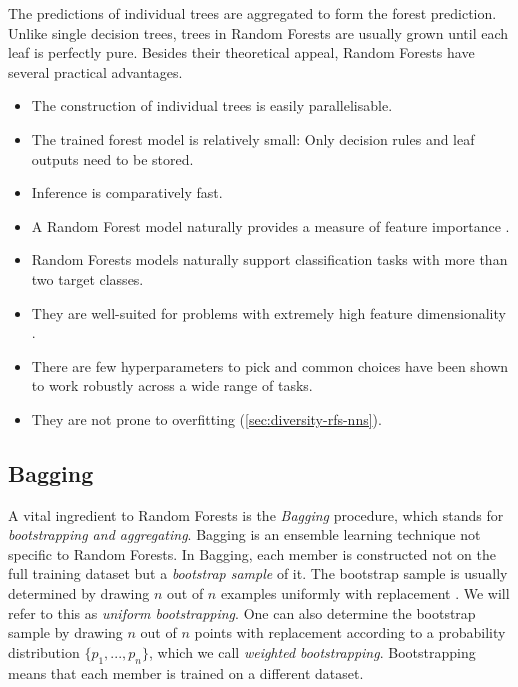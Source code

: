 \documentclass[../main.tex]{subfiles}
\begin{document}
The predictions of individual trees are aggregated to form the forest prediction. Unlike single decision trees, trees in Random Forests are usually grown until each leaf is perfectly pure. Besides their theoretical appeal, Random Forests have several practical advantages.
\begin{itemize}
    \item The construction of individual trees is easily parallelisable.
    \item The trained forest model is relatively small: Only decision rules and leaf outputs need to be stored.
    \item Inference is comparatively fast.
    \item A Random Forest model naturally provides a measure of feature importance \cite{breiman_ClassificationRegressionTrees_2017}.
    \item Random Forests models naturally support classification tasks with more than two target classes.
    \item They are well-suited for problems with extremely high feature dimensionality \cite{yang_ReviewEnsembleMethods_2010}.
    \item There are few hyperparameters to pick and common choices have been shown to work robustly across a wide range of tasks. %
    \item They are not prone to overfitting (\cf \cref{sec:diversity-rfs-nns}).
\end{itemize}


\subsection{Bagging}
\label{sec:bagging}

A vital ingredient to Random Forests is the \textit{Bagging} procedure, which stands for \textit{bootstrapping and aggregating}. Bagging is an ensemble learning technique not specific to Random Forests. In Bagging, each member is constructed not on the full training dataset but a \textit{bootstrap sample} of it. The bootstrap sample is usually determined by drawing $n$ out of $n$ examples uniformly with replacement \cite{breiman_RandomForests_2001,buschjager_GeneralizedNegativeCorrelation_2020}. We will refer to this as \textit{uniform bootstrapping}. One can also determine the bootstrap sample by drawing $n$ out of $n$ points with replacement according to a probability distribution $\{p_1, ..., p_n\}$, which we call \textit{weighted bootstrapping}. Bootstrapping means that each member is trained on a different dataset. 
\end{document}
